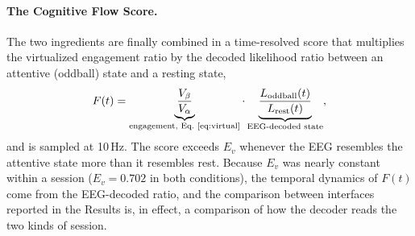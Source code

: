 \documentclass[utf8]{frontiers_suppmat}
\begin{document}
\paragraph*{The Cognitive Flow Score.} The two ingredients are finally combined in a time-resolved score that multiplies the virtualized engagement ratio by the decoded likelihood ratio between an attentive (oddball) state and a resting state,
\begin{equation}\label{eq:cfs}
F(t)=\underbrace{\frac{V_\beta}{V_\alpha}}_{\text{engagement, Eq.~\ref{eq:virtual}}}\cdot\underbrace{\frac{L_{\mathrm{oddball}}(t)}{L_{\mathrm{rest}}(t)}}_{\text{EEG-decoded state}},
\end{equation}
and is sampled at 10\,Hz. The score exceeds $E_v$ whenever the EEG resembles the attentive state more than it resembles rest. Because $E_v$ was nearly constant within a session ($E_v=0.702$ in both conditions), the temporal dynamics of $F(t)$ come from the EEG-decoded ratio, and the comparison between interfaces reported in the Results is, in effect, a comparison of how the decoder reads the two kinds of session.
\end{document}
